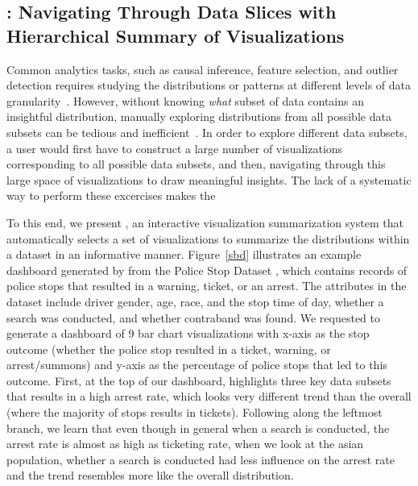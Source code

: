 \subsection{\sbd: Navigating Through Data Slices with Hierarchical Summary of Visualizations}
\par Common analytics tasks, such as causal inference, feature selection, and outlier detection requires studying the distributions or patterns at different levels of data granularity~\cite{Anand2015,Wu2013,Heer2012}. However, without knowing \textit{what} subset of data contains an insightful distribution, manually exploring distributions from all possible data subsets can be tedious and inefficient~\cite{Sarawagi1998,Sarawagi2000}. In order to explore different data subsets, a user would first have to construct a large number of visualizations corresponding to all possible data subsets, and then, navigating through this large space of visualizations to draw meaningful insights. The lack of a systematic way to perform these excercises makes the
\par To this end, we present \sbd, an interactive visualization summarization system that automatically selects a set of visualizations to summarize the distributions within a dataset in an informative manner. Figure~\ref{sbd} illustrates an example dashboard generated by \sbd from the Police Stop Dataset \cite{police}, which contains records of police stops that resulted in a warning, ticket, or an arrest. The attributes in the dataset include driver gender, age, race, and the stop time of day, whether a search was conducted, and whether contraband was found. We requested \sbd to generate a dashboard of 9 bar chart visualizations with x-axis as the stop outcome (whether the police stop resulted in a ticket, warning, or arrest/summons) and y-axis as the percentage of police stops that led to this outcome. First, at the top of our dashboard, \sbd highlights three key data subsets that results in a high arrest rate, which looks very different trend than the overall (where the majority of stops results in tickets). Following along the leftmost branch, we learn that even though in general when a search is conducted, the arrest rate is almost as high as ticketing rate, when we look at the asian population, whether a search is conducted had less influence on the arrest rate and the trend resembles more like the overall distribution.
